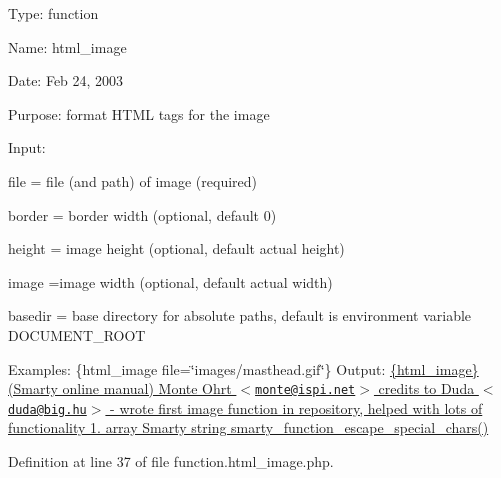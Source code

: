 \-Type\-: function\par
 \-Name\-: html\-\_\-image\par
 \-Date\-: \-Feb 24, 2003\par
 \-Purpose\-: format \-H\-T\-M\-L tags for the image\par
 \-Input\-:\par

\begin{DoxyItemize}
\item file = file (and path) of image (required)
\item border = border width (optional, default 0)
\item height = image height (optional, default actual height)
\item image =image width (optional, default actual width)
\item basedir = base directory for absolute paths, default is environment variable \-D\-O\-C\-U\-M\-E\-N\-T\-\_\-\-R\-O\-O\-T
\end{DoxyItemize}

\-Examples\-: \{html\-\_\-image file=\char`\"{}images/masthead.\-gif\char`\"{}\} \-Output\-:  \hyperlink{}{\{html\-\_\-image\} (\-Smarty online manual)  \-Monte \-Ohrt $<$\href{mailto:monte@ispi.net}{\tt monte@ispi.\-net}$>$  credits to \-Duda $<$\href{mailto:duda@big.hu}{\tt duda@big.\-hu}$>$ -\/ wrote first image function in repository, helped with lots of functionality  1.  array  \-Smarty  string  smarty\-\_\-function\-\_\-escape\-\_\-special\-\_\-chars() }

\-Definition at line 37 of file function.\-html\-\_\-image.\-php.


